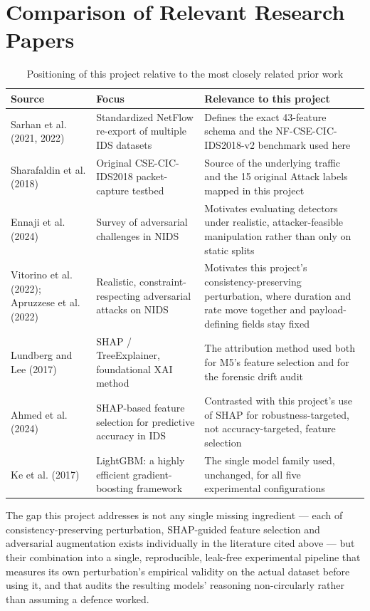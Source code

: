 \documentclass[12pt,a4paper]{report}
\begin{document}
\section{Comparison of Relevant Research Papers}
\begin{table}[h]\centering
\caption{Positioning of this project relative to the most closely related prior work}
\begin{tabularx}{\linewidth}{XXX}
\toprule
\textbf{Source} & \textbf{Focus} & \textbf{Relevance to this project} \\
\midrule
Sarhan et al. (2021, 2022) & Standardized NetFlow re-export of multiple IDS datasets & Defines the exact 43-feature schema and the NF-CSE-CIC-IDS2018-v2 benchmark used here \\
Sharafaldin et al. (2018) & Original CSE-CIC-IDS2018 packet-capture testbed & Source of the underlying traffic and the 15 original Attack labels mapped in this project \\
Ennaji et al. (2024) & Survey of adversarial challenges in NIDS & Motivates evaluating detectors under realistic, attacker-feasible manipulation rather than only on static splits \\
Vitorino et al. (2022); Apruzzese et al. (2022) & Realistic, constraint-respecting adversarial attacks on NIDS & Motivates this project's consistency-preserving perturbation, where duration and rate move together and payload-defining fields stay fixed \\
Lundberg and Lee (2017) & SHAP / TreeExplainer, foundational XAI method & The attribution method used both for M5's feature selection and for the forensic drift audit \\
Ahmed et al. (2024) & SHAP-based feature selection for predictive accuracy in IDS & Contrasted with this project's use of SHAP for robustness-targeted, not accuracy-targeted, feature selection \\
Ke et al. (2017) & LightGBM: a highly efficient gradient-boosting framework & The single model family used, unchanged, for all five experimental configurations \\
\bottomrule
\end{tabularx}
\end{table}
The gap this project addresses is not any single missing ingredient --- each of consistency-preserving perturbation, SHAP-guided feature selection and adversarial augmentation exists individually in the literature cited above --- but their combination into a single, reproducible, leak-free experimental pipeline that measures its own perturbation's empirical validity on the actual dataset before using it, and that audits the resulting models' reasoning non-circularly rather than assuming a defence worked.
\end{document}
